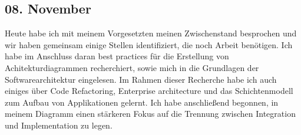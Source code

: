 \subsection{08. November}
Heute habe ich mit meinem Vorgesetzten meinen Zwischenstand besprochen und wir haben gemeinsam einige Stellen identifiziert, die noch Arbeit benötigen. Ich habe im Anschluss daran best practices für die Erstellung von Achitekturdiagrammen recherchiert, sowie mich in die Grundlagen der Softwarearchitektur eingelesen. Im Rahmen dieser Recherche habe ich auch einiges über Code Refactoring, Enterprise architecture und das Schichtenmodell zum Aufbau von Applikationen gelernt. Ich habe anschließend begonnen, in meinem Diagramm einen stärkeren Fokus auf die Trennung zwischen Integration und Implementation zu legen.